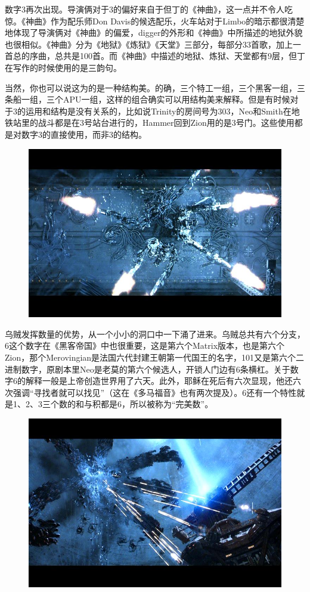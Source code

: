 \documentclass[UTF8]{ctexart}
\begin{document}
数字3再次出现。导演俩对于3的偏好来自于但丁的《神曲》，这一点并不令人吃惊。《神曲》作为配乐师Don Davis的候选配乐，火车站对于Limbo的暗示都很清楚地体现了导演俩对《神曲》的偏爱，digger的外形和《神曲》中所描述的地狱外貌也很相似。《神曲》分为《地狱》《炼狱》《天堂》三部分，每部分33首歌，加上一首总的序曲，总共是100首。而《神曲》中描述的地狱、炼狱、天堂都有9层，但丁在写作的时候使用的是三韵句。

当然，你也可以说这为的是一种结构美。的确，三个特工一组，三个黑客一组，三条船一组，三个APU一组，这样的组合确实可以用结构美来解释。但是有时候对于3的运用和结构是没有关系的，比如说Trinity的房间号为303，Neo和Smith在地铁站里的战斗都是在3号站台进行的，Hammer回到Zion用的是3号门。这些使用都是对数字3的直接使用，而非3的结构。

\begin{figure}[htb]
\centering
\includegraphics[width=0.5\linewidth]{fig/0874fcfae17645deb48f31ee.jpg}
\end{figure}

乌贼发挥数量的优势，从一个小小的洞口中一下涌了进来。乌贼总共有六个分支，6这个数字在《黑客帝国》中也很重要，这是第六个Matrix版本，也是第六个Zion，那个Merovingian是法国六代封建王朝第一代国王的名字，101又是第六个二进制数字，原剧本里Neo是老莫的第六个候选人，开锁人门边有6条横杠。关于数字6的解释一般是上帝创造世界用了六天。此外，耶稣在死后有六次显现，他还六次强调“寻找者就可以找见”（这在《多马福音》也有两次提及）。6还有一个特性就是1、2、3三个数的和与积都是6，所以被称为“完美数”。

\begin{figure}[htb]
\centering
\includegraphics[width=0.5\linewidth]{fig/2fc3cc11f0d8ff10b9127bd2.jpg}
\end{figure}
\end{document}

